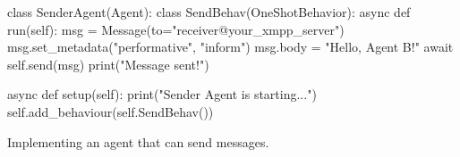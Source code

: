 \begin{frame}[fragile]{\insertsection}
    \begin{listing}
        \begin{mintedPython}
class SenderAgent(Agent):
    class SendBehav(OneShotBehavior):
        async def run(self):
            msg = Message(to="receiver@your_xmpp_server")
            msg.set_metadata("performative", "inform")
            msg.body = "Hello, Agent B!"
            await self.send(msg)
            print("Message sent!")

    async def setup(self):
        print("Sender Agent is starting...")
        self.add_behaviour(self.SendBehav())
        \end{mintedPython}
        \caption{Implementing an agent that can send messages.}
    \end{listing}
\end{frame}
